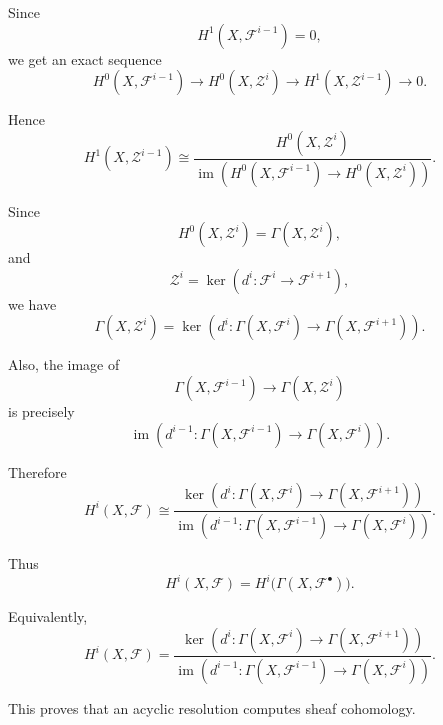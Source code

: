 Since
\[
H^1(X,\mathcal F^{i-1})=0,
\]
we get an exact sequence
\[
H^0(X,\mathcal F^{i-1})
\to H^0(X,\mathcal Z^i)
\to H^1(X,\mathcal Z^{i-1})
\to 0.
\]

Hence
\[
H^1(X,\mathcal Z^{i-1})
\cong
\frac{
	H^0(X,\mathcal Z^i)
}{
	\operatorname{im}\left(
	H^0(X,\mathcal F^{i-1})
	\to H^0(X,\mathcal Z^i)
	\right)
}.
\]

Since
\[
H^0(X,\mathcal Z^i)
=
\Gamma(X,\mathcal Z^i),
\]
and
\[
\mathcal Z^i=\ker(d^i:\mathcal F^i\to \mathcal F^{i+1}),
\]
we have
\[
\Gamma(X,\mathcal Z^i)
=
\ker\left(
d^i:\Gamma(X,\mathcal F^i)\to \Gamma(X,\mathcal F^{i+1})
\right).
\]

Also, the image of
\[
\Gamma(X,\mathcal F^{i-1})
\to
\Gamma(X,\mathcal Z^i)
\]
is precisely
\[
\operatorname{im}\left(
d^{i-1}:\Gamma(X,\mathcal F^{i-1})
\to \Gamma(X,\mathcal F^i)
\right).
\]

Therefore
\[
H^i(X,\mathcal F)
\cong
\frac{
	\ker\left(
	d^i:\Gamma(X,\mathcal F^i)\to \Gamma(X,\mathcal F^{i+1})
	\right)
}{
	\operatorname{im}\left(
	d^{i-1}:\Gamma(X,\mathcal F^{i-1})\to \Gamma(X,\mathcal F^i)
	\right)
}.
\]

Thus
\[
\boxed{
	H^i(X,\mathcal F)
	=
	H^i\bigl(\Gamma(X,\mathcal F^\bullet)\bigr).
}
\]

Equivalently,
\[
\boxed{
	H^i(X,\mathcal F)
	=
	\frac{
		\ker\left(
		d^i:\Gamma(X,\mathcal F^i)\to \Gamma(X,\mathcal F^{i+1})
		\right)
	}{
		\operatorname{im}\left(
		d^{i-1}:\Gamma(X,\mathcal F^{i-1})\to \Gamma(X,\mathcal F^i)
		\right)
	}.
}
\]

This proves that an acyclic resolution computes sheaf cohomology.
